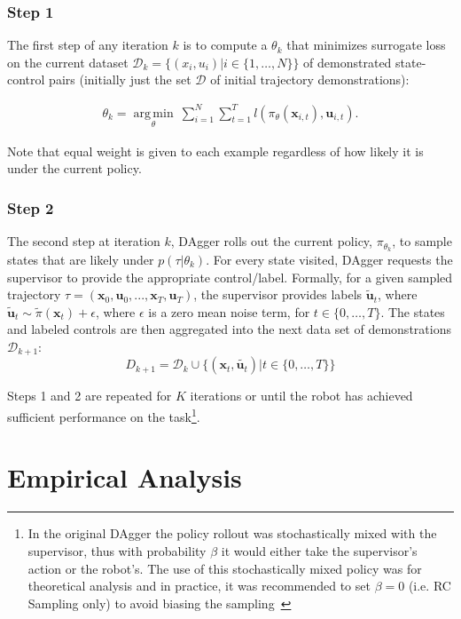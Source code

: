 \documentclass[10pt, conference]{ieeeconf}      %
\DeclareMathOperator*{\argmin}{arg\,min}
\newcommand{\bu}{\mathbf{u}}
\newcommand{\bx}{\mathbf{x}}
\begin{document}
\subsubsection{Step 1}
The first step of any iteration $k$ is to compute a $\theta_k$ that minimizes surrogate loss on the current dataset $\mathcal{D}_k=\{(x_i,u_i)|i\in\{1,\ldots,N\}\}$ of demonstrated state-control pairs (initially just the set $\mathcal{D}$ of initial trajectory demonstrations):

 \vspace{-1ex}
\begin{align}\label{eq:super_objj}
\theta_{k} = \underset{\theta}{\argmin} \: \sum_{i=1}^{N} \sum_{t=1}^T  l(\pi_{\theta}(\bx_{i,t}),\bu_{i,t}).
\end{align}

\noindent Note that equal weight is given to each example regardless of how likely it is under the current policy.
 

 \subsubsection{Step 2}
The second step at iteration $k$, DAgger rolls out the current policy, $\pi_{\theta_{k}}$, to sample states that are likely under $p(\tau|\theta_{k})$.  For every state visited, DAgger requests the supervisor to provide the appropriate control/label. Formally, for a given sampled trajectory  $\tau = (\bx_0,\bu_0,...,\bx_T,\bu_T )$, the supervisor provides labels $\tilde{\bu}_t$, where $\tilde{\bu}_t \sim \tilde{\pi}(\bx_t) + \epsilon$, where $\epsilon$ is a  zero mean noise term, for $t\in \{0, \ldots, T\}$.
The states and labeled controls are then aggregated into the next data set of demonstrations $\mathcal{D}_{k+1}$:
$$D_{k+1}=\mathcal{D}_k \cup \{(\bx_t,\tilde{\bu_t})|t\in\{0,\ldots,T\}\} $$

\noindent Steps 1 and 2 are repeated for $K$ iterations or until the robot has achieved sufficient performance on the
task\footnote{In the original DAgger the policy rollout was stochastically mixed with the supervisor, thus with
    probability $\beta$ it would either take the supervisor's action or the robot's. The use of this stochastically mixed
    policy was for theoretical analysis and in practice, it was recommended to set $\beta = 0$ (i.e. RC Sampling only) to avoid biasing the
sampling~\cite{NIPS2014_5421,ross2010reduction}}.


 


\section{Empirical Analysis}
\end{document}
